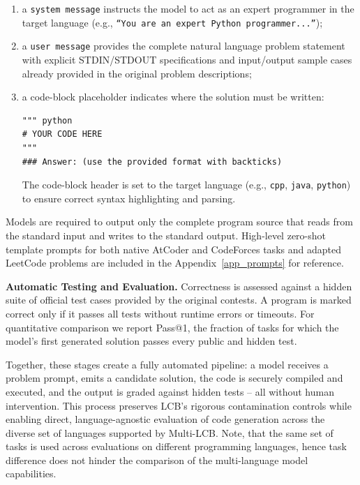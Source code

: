 \documentclass{llmxive}
\begin{document}
\begin{enumerate}
    \item  a \texttt{system message} instructs the model to act as an expert programmer in the target language  (e.g., \texttt{``You are an expert Python programmer...''});
    \item  a \texttt{user message} provides the complete natural language problem statement with explicit STDIN/STDOUT specifications and input/output sample cases already provided in the original problem descriptions; 
    \item a code-block placeholder indicates where the solution must be written:
\begin{verbatim}
""" python
# YOUR CODE HERE
"""
### Answer: (use the provided format with backticks)
\end{verbatim}
The code-block header is set to the target language (e.g., \texttt{cpp}, \texttt{java}, \texttt{python}) to ensure correct syntax highlighting and parsing.
\end{enumerate}


Models are required to output only the complete program source that reads from the standard input and writes to the standard output.
High-level zero-shot template prompts for both native AtCoder and CodeForces tasks and adapted LeetCode problems are included in the Appendix~\ref{app_prompts} for reference.


\textbf{Automatic Testing and Evaluation.} Correctness is assessed against a hidden suite of official test cases provided by the original contests. A program is marked correct only if it passes all tests without runtime errors or timeouts. For quantitative comparison we report Pass@1, the fraction of tasks for which the model’s first generated solution passes every public and hidden test.


Together, these stages create a fully automated pipeline: a model receives a problem prompt, emits a candidate solution, the code is securely compiled and executed, and the output is graded against hidden tests -- all without human intervention.
This process preserves LCB’s rigorous contamination controls while enabling direct, language-agnostic evaluation of code generation across the diverse set of languages supported by Multi-LCB. Note, that the same set of tasks is used across evaluations on different programming languages, hence task difference does not hinder the comparison of the multi-language model capabilities.
\end{document}
